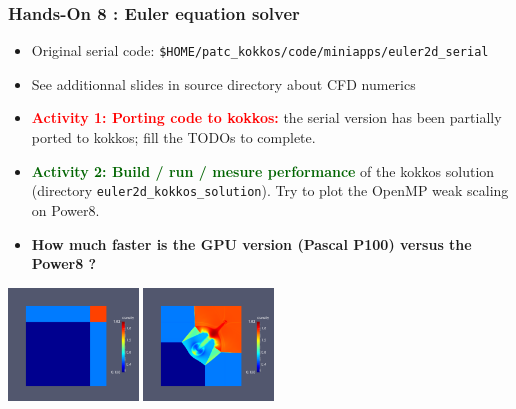 \begin{frame}[fragile=singleslide]
  \frametitle{Hands-On 8 : Euler equation solver}

  \hypertarget{handson8}{}
  \begin{itemize}
  \item Original serial code: \texttt{\$HOME/patc\_kokkos/code/miniapps/euler2d\_serial}
  \item See additionnal slides in source directory about CFD numerics
  \item \textcolor{red}{\bf Activity 1: Porting code to kokkos:} the serial version has been partially ported to kokkos; fill the TODOs to complete.
  \item \textcolor{darkgreen}{\bf Activity 2: Build / run / mesure performance} of the kokkos solution (directory \texttt{euler2d\_kokkos\_solution}). Try to plot the OpenMP weak scaling on Power8.
  \item {\bf How much faster is the GPU version (Pascal P100) versus the Power8 ?}
  \end{itemize}
  
  \begin{center}
    \includegraphics[height=3.0cm]{../euler/images/riemann/riemann_1}
    \hspace{0.1cm}
    \includegraphics[height=3.0cm]{../euler/images/riemann/riemann_2}
  \end{center}


\end{frame}
